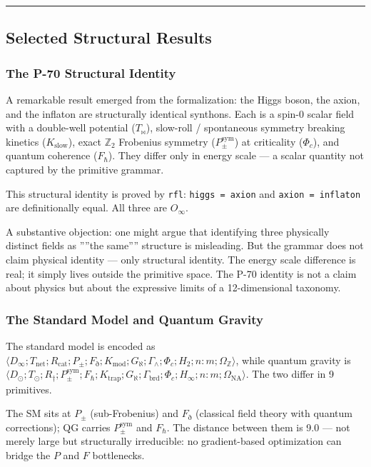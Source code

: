 \documentclass[12pt,a4paper]{article}
\begin{document}
\begin{center}
\rule{0.5\textwidth}{0.4pt}
\end{center}

\subsection{Selected Structural Results}

\subsubsection{The P-70 Structural Identity}

A remarkable result emerged from the formalization: the Higgs boson, the axion, and the inflaton are structurally identical synthons. Each is a spin-0 scalar field with a double-well potential ($T_{\bowtie}$), slow-roll / spontaneous symmetry breaking kinetics ($K_{\text{slow}}$), exact $\mathbb{Z}_2$ Frobenius symmetry ($P_{\pm}^{\text{sym}}$) at criticality ($\Phi_c$), and quantum coherence ($F_{\hbar}$). They differ only in energy scale --- a scalar quantity not captured by the primitive grammar.

This structural identity is proved by \texttt{rfl}: \texttt{higgs = axion} and \texttt{axion = inflaton} are definitionally equal. All three are $O_{\infty}$.

A substantive objection: one might argue that identifying three physically distinct fields as ''''the same'''' structure is misleading. But the grammar does not claim physical identity --- only structural identity. The energy scale difference is real; it simply lives outside the primitive space. The P-70 identity is not a claim about physics but about the expressive limits of a 12-dimensional taxonomy.

\subsubsection{The Standard Model and Quantum Gravity}

The standard model is encoded as $\langle D_{\infty}; T_{\text{net}}; R_{\text{cat}}; P_{\pm}; F_{\eth}; K_{\text{mod}}; G_{\aleph}; \Gamma_{\wedge}; \Phi_c; H_2; n{:}m; \Omega_\mathbb{Z} \rangle$, while quantum gravity is $\langle D_{\odot}; T_{\odot}; R_{\dagger}; P_{\pm}^{\text{sym}}; F_{\hbar}; K_{\text{trap}}; G_{\aleph}; \Gamma_{\text{brd}}; \Phi_c; H_{\infty}; n{:}m; \Omega_{\text{NA}} \rangle$. The two differ in 9 primitives.

The SM sits at $P_{\pm}$ (sub-Frobenius) and $F_{\eth}$ (classical field theory with quantum corrections); QG carries $P_{\pm}^{\text{sym}}$ and $F_{\hbar}$. The distance between them is 9.0 --- not merely large but structurally irreducible: no gradient-based optimization can bridge the $P$ and $F$ bottlenecks.
\end{document}
